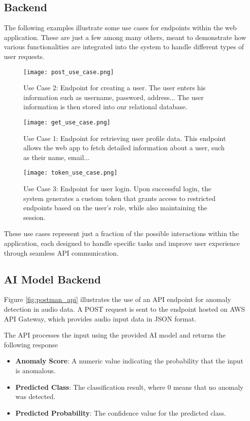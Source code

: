 \documentclass[conference]{IEEEtran}
\begin{document}
\subsection{Backend}

The following examples illustrate some use cases for endpoints within the web application. These are just a few among many others, meant to demonstrate how various functionalities are integrated into the system to handle different types of user requests.

\begin{figure}[H]
    \centering
    \texttt{[image: post\_use\_case.png]}
    \caption{Use Case 2: Endpoint for creating a user. The user enters his information such as username, password, address... The user information is then stored into our relational database.}
\end{figure}


\begin{figure}[H]
    \centering
    \texttt{[image: get\_use\_case.png]}
    \caption{Use Case 1: Endpoint for retrieving user profile data. This endpoint allows the web app to fetch detailed information about a user, such as their name, email...}
\end{figure}

\begin{figure}[H]
    \centering
    \texttt{[image: token\_use\_case.png]}
    \caption{Use Case 3: Endpoint for user login. Upon successful login, the system generates a custom token that grants access to restricted endpoints based on the user's role, while also maintaining the session.}
\end{figure}


These use cases represent just a fraction of the possible interactions within the application, each designed to handle specific tasks and improve user experience through seamless API communication.

\subsection{AI Model Backend}

Figure \ref{fig:postman_api} illustrates the use of an API endpoint for anomaly detection in audio data. A POST request is sent to the endpoint hosted on AWS API Gateway, which provides audio input data in JSON format. 

The API processes the input using the provided AI model and returns the following response
\begin{itemize}
    \item \textbf{Anomaly Score}: A numeric value indicating the probability that the input is anomalous.
    \item \textbf{Predicted Class}: The classification result, where 0 means that no anomaly was detected.
    \item \textbf{Predicted Probability}: The confidence value for the predicted class.
\end{itemize}
\end{document}
